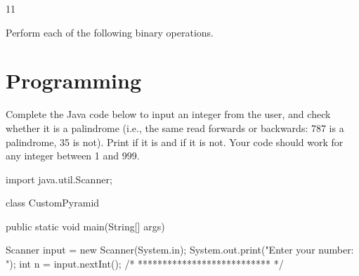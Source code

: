 \documentclass[answers,addpoints]{exam} %
\begin{document}
\begin{questions}
\begin{parts}

    \begin{solution}
        11
    \end{solution}
\end{parts}

\question Perform each of the following binary operations.

\section{Programming}

\question[15] Complete the Java code below to input an integer from the user, and check whether it is a palindrome (i.e., the same read forwards or backwards: 787 is a palindrome, 35 is not). Print  if it is and  if it is not. Your code should work for any integer between 1 and 999.

\begin{code}
import java.util.Scanner;

class CustomPyramid {
    public static void main(String[] args) {
    	Scanner input = new Scanner(System.in);
        System.out.print("Enter your number: ");
        int n = input.nextInt();
       	/* *************************** */
        
     
     
     
     
     
     
}}
\end{code}
\end{questions}
\end{document}
